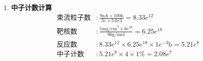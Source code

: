 \documentclass{article}
\begin{document}
\begin{enumerate}
  \item \textbf{中子计数计算}
  \begin{align*}
    \text{束流粒子数} & : \frac{9\text{nA} \times 100\text{h}}{3e \times 3.6e3} = 8.33e^{12} \\
    \text{靶核数} & : \frac{1\text{mg/cm}^2 \times 6e^{23}}{96\text{g/mol}} = 6.25e^{18} \\
    \text{反应数} & : 8.33e^{12} \times 6.25e^{18} \times 1e^{-3}\text{b} = 5.21e^{8} \\
    \text{中子计数} & : 5.21e^{8} \times 4 \times 1\% = 2.08e^{7}
  \end{align*}
\end{enumerate}
\end{document}
